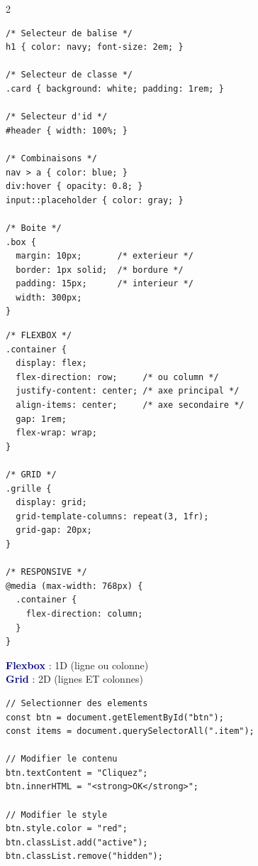 \documentclass[a4paper,10pt]{article}
\newcommand{\key}[1]{\textbf{\textcolor{navy}{#1}}}
\begin{document}
\begin{multicols}{2}
\begin{tcolorbox}[basebox, colframe=teal, title=3. CSS — Sélecteurs et propriétés]
\begin{lstlisting}[style=css]
/* Selecteur de balise */
h1 { color: navy; font-size: 2em; }

/* Selecteur de classe */
.card { background: white; padding: 1rem; }

/* Selecteur d'id */
#header { width: 100%; }

/* Combinaisons */
nav > a { color: blue; }
div:hover { opacity: 0.8; }
input::placeholder { color: gray; }

/* Boite */
.box {
  margin: 10px;       /* exterieur */
  border: 1px solid;  /* bordure */
  padding: 15px;      /* interieur */
  width: 300px;
}
\end{lstlisting}
\end{tcolorbox}

\begin{tcolorbox}[basebox, colframe=teal, title=4. CSS — Flexbox \& Grid]
\begin{lstlisting}[style=css]
/* FLEXBOX */
.container {
  display: flex;
  flex-direction: row;     /* ou column */
  justify-content: center; /* axe principal */
  align-items: center;     /* axe secondaire */
  gap: 1rem;
  flex-wrap: wrap;
}

/* GRID */
.grille {
  display: grid;
  grid-template-columns: repeat(3, 1fr);
  grid-gap: 20px;
}

/* RESPONSIVE */
@media (max-width: 768px) {
  .container {
    flex-direction: column;
  }
}
\end{lstlisting}
\key{Flexbox} : 1D (ligne ou colonne) \\
\key{Grid} : 2D (lignes ET colonnes)
\end{tcolorbox}

\begin{tcolorbox}[basebox, colframe=navy, title=5. JavaScript — Manipulation du DOM]
\begin{lstlisting}[style=js]
// Selectionner des elements
const btn = document.getElementById("btn");
const items = document.querySelectorAll(".item");

// Modifier le contenu
btn.textContent = "Cliquez";
btn.innerHTML = "<strong>OK</strong>";

// Modifier le style
btn.style.color = "red";
btn.classList.add("active");
btn.classList.remove("hidden");


\end{lstlisting}
\end{tcolorbox}
\end{multicols}
\end{document}
